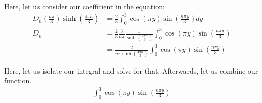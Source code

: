 \documentclass{article}
\begin{document}
\begin{enumerate}
\begin{enumerate}
    Here, let us consider our coefficient in the equation:
    \begin{align}
      D_n \left(\frac{n \pi}{3}\right) \sinh\left(\frac{4 \pi n}{3}\right)
      & = \frac{2}{3} \int^3_0 \cos(\pi y) \sin\left(\frac{n \pi y}{3}\right) dy\\
      D_n & =
      \frac{2}{3}
      \frac{3}{n \pi}
      \frac{1}{\sinh\left(\frac{4 \pi n}{3}\right)}
      \int^3_0 \cos(\pi y) \sin\left(\frac{n \pi y}{3}\right)\\
      & =
      \frac{2}{n \pi \sinh\left(\frac{4 \pi n}{3}\right)}
      \int^3_0 \cos(\pi y) \sin\left(\frac{n \pi y}{3}\right)
    \end{align}

    Here, let us isolate our integral and solve for that. Afterwards, let us combine our function.
    \begin{align}
      \int^3_0 \cos(\pi y) \sin\left(\frac{n \pi y}{3}\right)
    \end{align}






  \end{enumerate}

\newpage
%
%


\end{enumerate}
\end{document}

